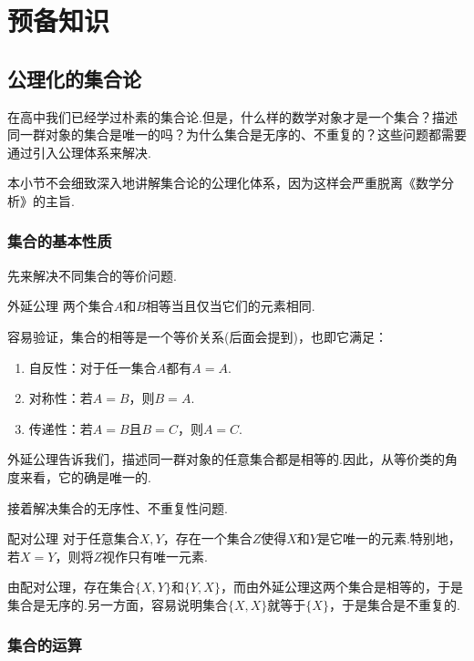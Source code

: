 \chapter{预备知识}

\section{公理化的集合论}

在高中我们已经学过朴素的集合论.但是，什么样的数学对象才是一个集合？描述同一群对象的集合是唯一的吗？为什么集合是无序的、不重复的？这些问题都需要通过引入公理体系来解决.

本小节不会细致深入地讲解集合论的公理化体系，因为这样会严重脱离《数学分析》的主旨.

\subsection{集合的基本性质}

先来解决不同集合的等价问题.

\begin{axiom}{外延公理}
	两个集合$A$和$B$相等当且仅当它们的元素相同.
\end{axiom}

容易验证，集合的相等是一个等价关系(后面会提到)，也即它满足：
\begin{enumerate}
	\item 自反性：对于任一集合$A$都有$A=A$.
	\item 对称性：若$A=B$，则$B=A$.
	\item 传递性：若$A=B$且$B=C$，则$A=C$.
\end{enumerate}

外延公理告诉我们，描述同一群对象的任意集合都是相等的.因此，从等价类的角度来看，它的确是唯一的.

接着解决集合的无序性、不重复性问题.

\begin{axiom}{配对公理}
	对于任意集合$X,Y$，存在一个集合$Z$使得$X$和$Y$是它唯一的元素.特别地，若$X=Y$，则将$Z$视作只有唯一元素.
\end{axiom}

由配对公理，存在集合$\{ X,Y \}$和$\{ Y,X \}$，而由外延公理这两个集合是相等的，于是集合是无序的.另一方面，容易说明集合$\{ X,X \}$就等于$\{ X \}$，于是集合是不重复的.

\subsection{集合的运算}

